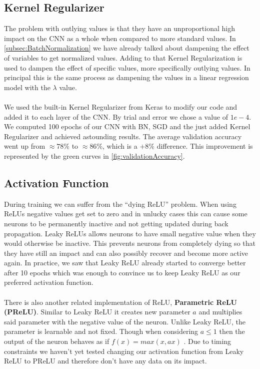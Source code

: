 \documentclass{article}
\begin{document}
	
	\subsection{Kernel Regularizer}
	\label{subsec:KernelRegularizer}
	The problem with outlying values is that they have an unproportional high impact on the CNN as a whole when compared to more standard values. In \autoref{subsec:BatchNormalization} we have already talked about dampening the effect of variables to get normalized values. Adding to that Kernel Regularization is used to dampen the effect of specific values, more specifically outlying values. In principal this is the same process as dampening the values in a linear regression model with the $\lambda$ value. \\
	\\
	We used the built-in Kernel Regularizer from Keras to modify our code and added it to each layer of the CNN. By trial and error we chose a value of $1e-4$. We computed 100 epochs of our CNN with BN, SGD and the just added Kernel Regularizer and achieved astounding results. The average validation accuracy went up from $\approx78\%$ to $\approx86\%$, which is a $+8\%$ difference. This improvement is represented by the green curves in \autoref{fig:validationAccuracy}. 
	
	
	\subsection{Activation Function}
	During training we can suffer from the \enquote{dying ReLU} problem. When using ReLUs negative values get set to zero and in unlucky cases this can cause some neurons to be permanently inactive and not getting updated during back propagation. Leaky ReLUs allows neurons to have small negative value when they would otherwise be inactive. This prevents neurons from completely dying so that they have still an impact and can also possibly recover and become more active again. In practice, we saw	that Leaky ReLU already started to converge better after 10 epochs which was enough to convince us to keep Leaky ReLU as our preferred activation function.\\
	\\
	There is also another related implementation of ReLU, \textbf{Parametric ReLU (PReLU)}. Similar to Leaky ReLU it creates new parameter $a$ and multiplies said parameter with the negative value of the neuron. Unlike Leaky ReLU, the parameter is learnable and not fixed. Though when considering $a \le 1$ then the output of the neuron behaves as if $f(x) = max (x, ax)$ \cite{DBLP:journals/corr/HeZR015}. Due to timing constraints we haven't yet tested changing our activation function from Leaky ReLU to PReLU and therefore don't have any data on its impact.
	
\end{document}
